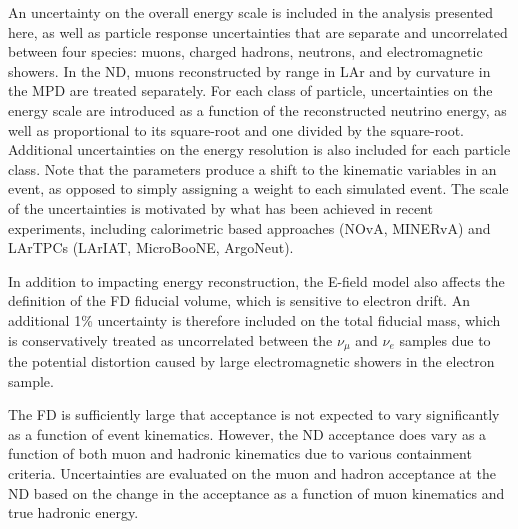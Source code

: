 An uncertainty on the overall energy scale is included in the analysis presented here, as well as particle response uncertainties that are separate and uncorrelated between four species: muons, charged hadrons, neutrons, and electromagnetic showers. In the ND, muons reconstructed by range in LAr and by curvature in the MPD are treated separately. For each class of particle, uncertainties on the energy scale are introduced as a function of the reconstructed neutrino energy, as well as proportional to its square-root and one divided by the square-root. Additional uncertainties on the energy resolution is also included for each particle class. Note that the parameters produce a shift to the kinematic variables in an event, as opposed to simply assigning a weight to each simulated event. The scale of the uncertainties is motivated by what has been achieved in recent experiments, including calorimetric based approaches (NOvA, MINERvA) and LArTPCs (LArIAT, MicroBooNE, ArgoNeut).

In addition to impacting energy reconstruction, the E-field model also affects the definition of the FD fiducial volume, which is sensitive to electron drift. An additional 1\% uncertainty is therefore included on the total fiducial mass, which is conservatively treated as uncorrelated between the $\nu_{\mu}$ and $\nu_{e}$ samples due to the potential distortion caused by large electromagnetic showers in the electron sample.

The FD is sufficiently large that acceptance is not expected to vary significantly as a function of event kinematics. However, the ND acceptance does vary as a function of both muon and hadronic kinematics due to various containment criteria. Uncertainties are evaluated on the muon and hadron acceptance at the ND based on the change in the acceptance as a function of muon kinematics and true hadronic energy.


